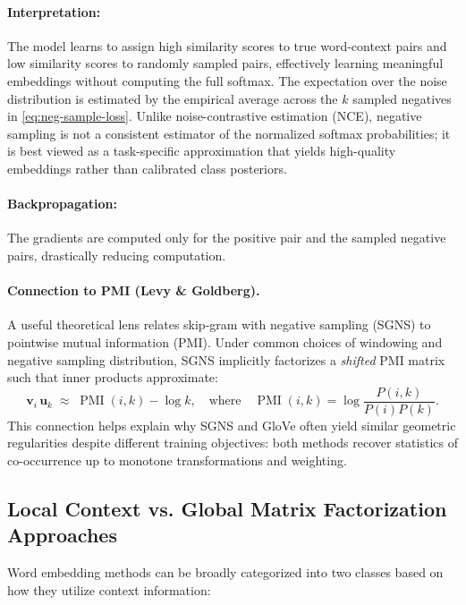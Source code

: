 \paragraph{Interpretation:} The model learns to assign high similarity scores to true word-context pairs and low similarity scores to randomly sampled pairs, effectively learning meaningful embeddings without computing the full softmax. The expectation over the noise distribution is estimated by the empirical average across the \(k\) sampled negatives in \eqref{eq:neg-sample-loss}. Unlike noise-contrastive estimation (NCE), negative sampling is not a consistent estimator of the normalized softmax probabilities; it is best viewed as a task-specific approximation that yields high-quality embeddings rather than calibrated class posteriors.

\paragraph{Backpropagation:} The gradients are computed only for the positive pair and the sampled negative pairs, drastically reducing computation.

\paragraph{Connection to PMI (Levy \& Goldberg).} A useful theoretical lens relates skip-gram with negative sampling (SGNS) to pointwise mutual information (PMI). Under common choices of windowing and negative sampling distribution, SGNS implicitly factorizes a \emph{shifted} PMI matrix such that inner products approximate:
\[
    \mathbf{v}_i\,\mathbf{u}_k \;\approx\; \operatorname{PMI}(i, k) - \log k,\quad \text{where}\quad \operatorname{PMI}(i, k)=\log\frac{P(i, k)}{P(i)P(k)}.
\]
This connection helps explain why SGNS and GloVe often yield similar geometric regularities despite different training objectives: both methods recover statistics of co-occurrence up to monotone transformations and weighting.

\subsection{Local Context vs. Global Matrix Factorization Approaches}
\label{sec:nlp_local_context_vs_global_matrix_factorization_approaches}

Word embedding methods can be broadly categorized into two classes based on how they utilize context information:

